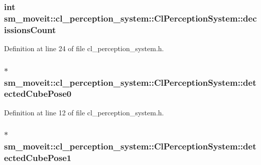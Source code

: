 \subsubsection[{\texorpdfstring{decissions\+Count}{decissionsCount}}]{\setlength{\rightskip}{0pt plus 5cm}int sm\+\_\+moveit\+::cl\+\_\+perception\+\_\+system\+::\+Cl\+Perception\+System\+::decissions\+Count}\hypertarget{classsm__moveit_1_1cl__perception__system_1_1ClPerceptionSystem_ab8272ccb5af7401beeb4e9eaf1d86fa3}{}\label{classsm__moveit_1_1cl__perception__system_1_1ClPerceptionSystem_ab8272ccb5af7401beeb4e9eaf1d86fa3}


Definition at line 24 of file cl\+\_\+perception\+\_\+system.\+h.

\subsubsection[{\texorpdfstring{detected\+Cube\+Pose0}{detectedCubePose0}}]{$\ast$ sm\+\_\+moveit\+::cl\+\_\+perception\+\_\+system\+::\+Cl\+Perception\+System\+::detected\+Cube\+Pose0}\hypertarget{classsm__moveit_1_1cl__perception__system_1_1ClPerceptionSystem_a4bf0838041a73d41008c2cb2daa6fb63}{}\label{classsm__moveit_1_1cl__perception__system_1_1ClPerceptionSystem_a4bf0838041a73d41008c2cb2daa6fb63}


Definition at line 12 of file cl\+\_\+perception\+\_\+system.\+h.

\subsubsection[{\texorpdfstring{detected\+Cube\+Pose1}{detectedCubePose1}}]{$\ast$ sm\+\_\+moveit\+::cl\+\_\+perception\+\_\+system\+::\+Cl\+Perception\+System\+::detected\+Cube\+Pose1}\hypertarget{classsm__moveit_1_1cl__perception__system_1_1ClPerceptionSystem_ae09f06cb609d0a233fa9a0d31dcb09c6}{}\label{classsm__moveit_1_1cl__perception__system_1_1ClPerceptionSystem_ae09f06cb609d0a233fa9a0d31dcb09c6}


